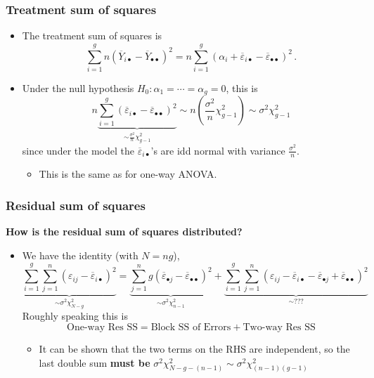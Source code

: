 \documentclass[a4paper]{article}
\begin{document}
\subsubsection{Treatment sum of squares}
\begin{itemize}
	\item The treatment sum of squares is
	\[
		\sum_{i=1}^gn(\overline Y_{i\bullet}-\overline Y_{\bullet\bullet})^2 =  n\sum_{i=1}^g(\alpha_i+\overline \varepsilon_{i\bullet}-\overline \varepsilon_{\bullet\bullet})^2\,.
	\]
	\item Under the null hypothesis \( H_0: \alpha_1 = \dotsb = \alpha_g = 0 \), this is
	\[
		n\underbrace{\sum_{i=1}^g(\overline \varepsilon_{i\bullet}-\overline \varepsilon_{\bullet\bullet})^2}_{\sim \frac{\sigma^2}{n}\chi^2_{g-1}}\sim n \left( \frac{\sigma^2}{n}\chi^2_{g-1} \right)\sim \sigma^2 \chi^2_{g-1}
	\]
	since under the model the \( \overline{\varepsilon}_{i\bullet} \)'s are idd normal with variance \( \frac{\sigma^2}{n} \).
	\begin{itemize}
		\item This is the same as for one-way ANOVA.
	\end{itemize}
\end{itemize}
\subsubsection{Residual sum of squares}
\textbf{How is the residual sum of squares distributed?}
\begin{itemize}
	\item We have the identity (with \( N = ng \)),
	\[
		\underbrace{\sum_{i=1}^g\sum_{j=1}^n (\varepsilon_{ij}-\overline \varepsilon_{i\bullet})^2}_{\sim \sigma^2\chi^2_{N-g}} = \underbrace{\sum_{j=1}^n g(\overline \varepsilon_{\bullet j}-\overline\varepsilon_{\bullet\bullet})^2}_{\sim \sigma^2\chi^2_{n-1}} + \underbrace{\sum_{i=1}^g\sum_{j=1}^n (\varepsilon_{ij}-\overline \varepsilon_{i\bullet}-\overline \varepsilon_{\bullet j}+\overline \varepsilon_{\bullet\bullet})^2}_{\sim ???}
	\]
	Roughly speaking this is
	\[
		\text{One-way Res SS} = \text{Block SS of Errors} + \text{Two-way Res SS}
	\]
	\begin{itemize}
		\item It can be shown that the two terms on the RHS are independent, so the last double sum \textbf{must be} \( \sigma^2\chi^2_{N-g-(n-1)}\sim\sigma^2\chi^2_{(n-1)(g-1)} \) 
	\end{itemize}
\end{itemize}
\end{document}
